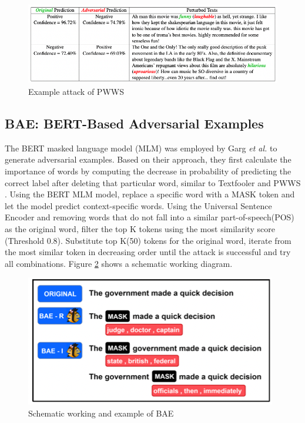 \documentclass[%
	BCOR=8mm, %
	DIV=12,
	toc=bibliography, %
	toc=listof, %
	oneside, %
	egregdoesnotlikesansseriftitles, %
	]{scrbook}
\begin{document}
\begin{figure}[h!]
    \centering
    \includegraphics[width=.8\textwidth]{img/PWWSexample.png}
    \caption[Example of PWWS attack recipe]{Example attack of PWWS\cite{ren_generating_2019} }
    \label{diag:pwwsexp}
\end{figure}

\subsection{BAE: BERT-Based Adversarial Examples}
\label{subsection:bae}
The BERT masked language model (MLM) was employed by Garg \textit{et al.} \cite{garg_bae_2020}  to generate adversarial examples. Based on their approach, they first calculate the importance of words by computing the decrease in probability of predicting the correct label after deleting that particular word, similar to Textfooler \cite{jia_certified_2019}  and PWWS \cite{ren_generating_2019}. Using the BERT MLM model, replace a specific word with a MASK token and let the model predict context-specific words. Using the Universal Sentence Encoder \cite{cer_universal_2018} and removing words that do not fall into a similar part-of-speech(POS) as the original word, filter the top K tokens using the most similarity score (Threshold 0.8). Substitute top K(50) tokens for the original word, iterate from the most similar token in decreasing order until the attack is successful and try all combinations. Figure \ref{diag:baeexp} shows a schematic working diagram.
\begin{figure}[H]
    \centering
    \includegraphics[width=.5\textwidth]{img/BAEexample.png}
    \caption[Schematic working and example of BAE attack recipe]{Schematic working and example of BAE\cite{garg_bae_2020} }
    \label{diag:baeexp}
\end{figure}
\end{document}
